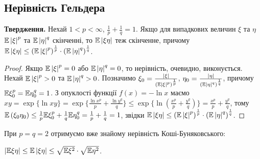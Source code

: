 \subsection{Нерівність Гельдера}
\noindent\textbf{Твердження.} Нехай $1 < p < \infty$, $\frac{1}{p} + \frac{1}{q} = 1$. Якщо для випадкових величин $\xi$ та $\eta$ 
$\mathbb{E}\left| \xi\right|^p$ та $\mathbb{E}\left| \eta\right|^q$ скінченні, то $\mathbb{E}\left| \xi \eta\right|$ теж скінченне, причому
$\mathbb{E}\left| \xi \eta\right| \leq \left( \mathbb{E}\left| \xi\right|^p\right)^{\frac{1}{p}} \cdot \left( \mathbb{E}\left| \eta\right|^q\right)^{\frac{1}{q}}$.
\begin{proof}
    Якщо $\mathbb{E}\left| \xi\right|^p = 0$ або $\mathbb{E}\left| \eta\right|^q = 0$, то нерівність, очевидно, виконується.
    Нехай $\mathbb{E}\left| \xi\right|^p >0$ та $\mathbb{E}\left| \eta\right|^q > 0$. Позначимо $\xi_0 = \frac{\left| \xi \right|}{\left( \mathbb{E}\left| \xi\right|^p\right)^{\frac{1}{p}}}$,
    $\eta_0 = \frac{\left| \eta \right|}{\left( \mathbb{E}\left| \eta\right|^q\right)^{\frac{1}{q}}}$, причому $\mathbb{E}\xi_0^p = \mathbb{E}\eta_0^q = 1$.
    З опуклості функції $f(x) = -\ln x$ маємо $xy = \exp\{\ln xy\}= \exp\{\frac{\ln x^p}{p} + \frac{\ln y^q}{q}\} \leq
    \exp\{ \ln \left( \frac{x^p}{p} + \frac{y^q}{q}\right)\} = \frac{x^p}{p} + \frac{y^q}{q}$, тому
    $\mathbb{E}\left( \xi_0 \eta_0 \right) \leq \frac{1}{p}\mathbb{E}\xi_0^p + \frac{1}{q}\mathbb{E}\eta_0^q = \frac{1}{p} + \frac{1}{q} = 1$,
    звідки $\mathbb{E}\left| \xi \eta\right| \leq \left( \mathbb{E}\left| \xi\right|^p\right)^{\frac{1}{p}} \cdot \left( \mathbb{E}\left| \eta\right|^q\right)^{\frac{1}{q}}$.
\end{proof}
\begin{remark}
    При $p = q = 2$ отримуємо вже знайому нерівність Коші-Буняковського:
    
    \noindent$\left| \mathbb{E} \xi \eta \right| \leq \mathbb{E}\left| \xi \eta \right| \leq \sqrt{\mathbb{E}\xi^2}\cdot\sqrt{\mathbb{E}\eta^2}$.
\end{remark}

